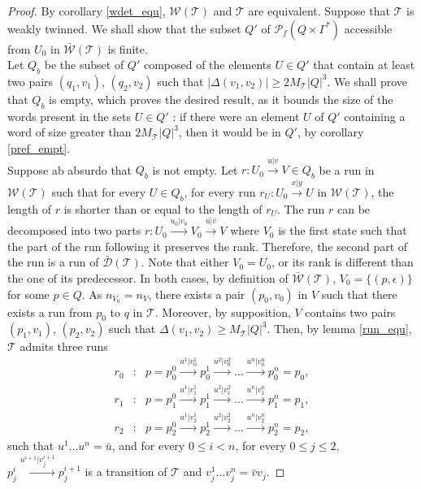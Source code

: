 \documentclass[envcountsame]{llncs}
\newcommand\tra{\mathcal{T}}
\begin{document}
\begin{proof}
By corollary \ref{wdet_equ}, $\mathcal{W}(\tra)$ and $\tra$ are equivalent.
Suppose that $\tra$ is weakly twinned.
We shall show that the subset $Q'$ of $\mathcal{P}_f(Q \times \Gamma^*)$ accessible from $U_0$ in $\bar{\mathcal{W}}(\tra)$ is finite.\\
Let $Q_b$ be the subset of $Q'$ composed of the elements $U \in Q'$ that contain at least two pairs $(q_1,v_1)$, $(q_2,v_2)$ such that $|\Delta(v_1,v_2)| \geq 2 M_{\tra} |Q|^3$.
We shall prove that $Q_b$ is empty, which proves the desired result, as it bounds the size of the words present in the sets $U \in Q'$ : if there were an element $U$ of $Q'$ containing a word of size greater than $2 M_{\tra} |Q|^3$, then it would be in $Q'$, by corollary \ref{pref_empt}.\\
Suppose ab absurdo that $Q_b$ is not empty.
Let $r : U_0 \xrightarrow{u|v} V \in Q_b$ be a run in $\mathcal{W}(\tra)$ such that for every $U \in Q_b$, for every run $r_{U} : U_0 \xrightarrow{x|y} U$ in $\mathcal{W}(\tra)$, the length of $r$ is shorter than or equal to the length of $r_{U}$.
The run $r$ can be decomposed into two parts
$r : U_0 \xrightarrow{u_0|v_0} V_0 \xrightarrow{\bar{u}|\bar{v}} V$
where $V_0$ is the first state such that the part of the run following it preserves the rank.
Therefore, the second part of the run is a run of $\bar{\mathcal{D}}(\tra)$.
Note that either $V_0 = U_0$, or its rank is different than the one of its predecessor.
In both cases, by definition of $\bar{\mathcal{W}}(\tra)$, $V_0 = \{ (p,\epsilon) \}$ for some $p \in Q$.
As $n_{V_0} = n_{V}$, there exists a pair $(p_0,v_0)$ in $V$ such that there exists a run from $p_0$ to $q$ in $\tra$.
Moreover, by supposition, $V$ contains two pairs $(p_1,v_1)$, $(p_2,v_2)$ such that $\Delta(v_1,v_2) \geq M_{\tra} |Q|^3$.
Then, by lemma \ref{run_equ}, $\tra$ admits three runs 
$$\begin{array}{lll}
r_0 & : & p = p_0^0 \xrightarrow{u^1|v_0^1} p_0^1 \xrightarrow{u^2|v_0^2} \ldots \xrightarrow{u^n|v_0^{n}} p_0^{n} = p_0,\\
r_1 & : & p = p_1^0 \xrightarrow{u^1|v_1^1} p_1^1 \xrightarrow{u^2|v_1^2} \ldots \xrightarrow{u^n|v_1^{n}} p_1^{n} = p_1,\\
r_2 & : & p = p_2^0 \xrightarrow{u^1|v_2^1} p_2^1 \xrightarrow{u^2|v_2^2} \ldots \xrightarrow{u^n|v_2^{n}} p_2^{n} = p_2,
\end{array}$$
such that $u^{1} \ldots u^{n} = \bar{u}$, and for every $0 \leq i < n$, for every $0 \leq j \leq 2$, $p_j^i \xrightarrow{u^{i+1}|v_j^{i+1}} p_j^{i+1}$ is a transition of $\tra$ and $v_j^{1} \ldots v_j^{n} = \bar{v}v_j$.

\end{proof}
\end{document}
